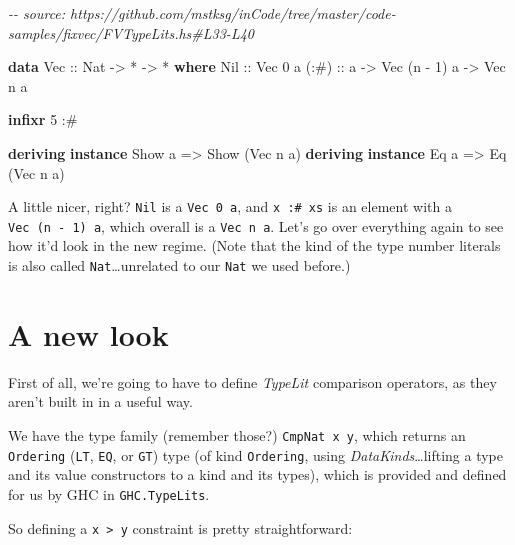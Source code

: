 \documentclass[]{article}
\newenvironment{Shaded}{}{}
\newcommand{\CommentTok}[1]{\textcolor[rgb]{0.38,0.63,0.69}{\textit{#1}}}
\newcommand{\DataTypeTok}[1]{\textcolor[rgb]{0.56,0.13,0.00}{#1}}
\newcommand{\DecValTok}[1]{\textcolor[rgb]{0.25,0.63,0.44}{#1}}
\newcommand{\KeywordTok}[1]{\textcolor[rgb]{0.00,0.44,0.13}{\textbf{#1}}}
\newcommand{\NormalTok}[1]{#1}
\newcommand{\OperatorTok}[1]{\textcolor[rgb]{0.40,0.40,0.40}{#1}}
\newcommand{\OtherTok}[1]{\textcolor[rgb]{0.00,0.44,0.13}{#1}}
\begin{document}
\begin{Shaded}
\begin{Highlighting}[]
\CommentTok{{-}{-} source: https://github.com/mstksg/inCode/tree/master/code{-}samples/fixvec/FVTypeLits.hs\#L33{-}L40}

\KeywordTok{data} \DataTypeTok{Vec}\OtherTok{ ::} \DataTypeTok{Nat} \OtherTok{{-}>} \OperatorTok{*} \OtherTok{{-}>} \OperatorTok{*} \KeywordTok{where}
    \DataTypeTok{Nil}\OtherTok{  ::} \DataTypeTok{Vec} \DecValTok{0}\NormalTok{ a}
\OtherTok{    (:\#) ::}\NormalTok{ a }\OtherTok{{-}>} \DataTypeTok{Vec}\NormalTok{ (n }\OperatorTok{{-}} \DecValTok{1}\NormalTok{) a }\OtherTok{{-}>} \DataTypeTok{Vec}\NormalTok{ n a}

\KeywordTok{infixr} \DecValTok{5} \OperatorTok{:\#}

\KeywordTok{deriving} \KeywordTok{instance} \DataTypeTok{Show}\NormalTok{ a }\OtherTok{=>} \DataTypeTok{Show}\NormalTok{ (}\DataTypeTok{Vec}\NormalTok{ n a)}
\KeywordTok{deriving} \KeywordTok{instance} \DataTypeTok{Eq}\NormalTok{ a }\OtherTok{=>} \DataTypeTok{Eq}\NormalTok{ (}\DataTypeTok{Vec}\NormalTok{ n a)}
\end{Highlighting}
\end{Shaded}

A little nicer, right? \texttt{Nil} is a \texttt{Vec\ 0\ a}, and
\texttt{x\ :\#\ xs} is an element with a \texttt{Vec\ (n\ -\ 1)\ a}, which
overall is a \texttt{Vec\ n\ a}. Let's go over everything again to see how it'd
look in the new regime. (Note that the kind of the type number literals is also
called \texttt{Nat}\ldots unrelated to our \texttt{Nat} we used before.)

\hypertarget{a-new-look}{%
\section{A new look}\label{a-new-look}}

First of all, we're going to have to define \emph{TypeLit} comparison operators,
as they aren't built in in a useful way.

We have the type family (remember those?) \texttt{CmpNat\ x\ y}, which returns
an \texttt{Ordering} (\texttt{LT}, \texttt{EQ}, or \texttt{GT}) type (of kind
\texttt{Ordering}, using \emph{DataKinds}\ldots lifting a type and its value
constructors to a kind and its types), which is provided and defined for us by
GHC in \texttt{GHC.TypeLits}.

So defining a \texttt{x\ \textgreater{}\ y} constraint is pretty
straightforward:
\end{document}
